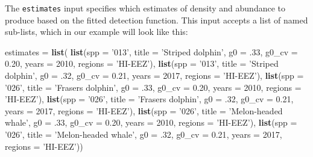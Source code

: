 \documentclass[
]{book}
\newenvironment{Shaded}{\begin{snugshade}}{\end{snugshade}}
\newcommand{\DataTypeTok}[1]{\textcolor[rgb]{0.13,0.29,0.53}{#1}}
\newcommand{\DecValTok}[1]{\textcolor[rgb]{0.00,0.00,0.81}{#1}}
\newcommand{\FloatTok}[1]{\textcolor[rgb]{0.00,0.00,0.81}{#1}}
\newcommand{\KeywordTok}[1]{\textcolor[rgb]{0.13,0.29,0.53}{\textbf{#1}}}
\newcommand{\NormalTok}[1]{#1}
\newcommand{\StringTok}[1]{\textcolor[rgb]{0.31,0.60,0.02}{#1}}
\begin{document}
The \texttt{estimates} input specifies which estimates of density and abundance to produce based on the fitted detection function. This input accepts a list of named sub-lists, which in our example will look like this:

\begin{Shaded}
\begin{Highlighting}[]
\NormalTok{estimates =}
\StringTok{  }\KeywordTok{list}\NormalTok{(}
    \KeywordTok{list}\NormalTok{(}\DataTypeTok{spp =} \StringTok{'013'}\NormalTok{,}
         \DataTypeTok{title =} \StringTok{'Striped dolphin'}\NormalTok{,}
         \DataTypeTok{g0 =} \FloatTok{.33}\NormalTok{, }\DataTypeTok{g0_cv =} \FloatTok{0.20}\NormalTok{,}
         \DataTypeTok{years =} \DecValTok{2010}\NormalTok{,}
         \DataTypeTok{regions =} \StringTok{'HI-EEZ'}\NormalTok{),}
    \KeywordTok{list}\NormalTok{(}\DataTypeTok{spp =} \StringTok{'013'}\NormalTok{,}
         \DataTypeTok{title =} \StringTok{'Striped dolphin'}\NormalTok{,}
         \DataTypeTok{g0 =} \FloatTok{.32}\NormalTok{, }\DataTypeTok{g0_cv =} \FloatTok{0.21}\NormalTok{,}
         \DataTypeTok{years =} \DecValTok{2017}\NormalTok{,}
         \DataTypeTok{regions =} \StringTok{'HI-EEZ'}\NormalTok{),}
    \KeywordTok{list}\NormalTok{(}\DataTypeTok{spp =} \StringTok{'026'}\NormalTok{,}
         \DataTypeTok{title =} \StringTok{'Frasers dolphin'}\NormalTok{,}
         \DataTypeTok{g0 =} \FloatTok{.33}\NormalTok{, }\DataTypeTok{g0_cv =} \FloatTok{0.20}\NormalTok{,}
         \DataTypeTok{years =} \DecValTok{2010}\NormalTok{,}
         \DataTypeTok{regions =} \StringTok{'HI-EEZ'}\NormalTok{),}
    \KeywordTok{list}\NormalTok{(}\DataTypeTok{spp =} \StringTok{'026'}\NormalTok{,}
         \DataTypeTok{title =} \StringTok{'Frasers dolphin'}\NormalTok{,}
         \DataTypeTok{g0 =} \FloatTok{.32}\NormalTok{, }\DataTypeTok{g0_cv =} \FloatTok{0.21}\NormalTok{,}
         \DataTypeTok{years =} \DecValTok{2017}\NormalTok{,}
         \DataTypeTok{regions =} \StringTok{'HI-EEZ'}\NormalTok{),}
    \KeywordTok{list}\NormalTok{(}\DataTypeTok{spp =} \StringTok{'026'}\NormalTok{,}
         \DataTypeTok{title =} \StringTok{'Melon-headed whale'}\NormalTok{,}
         \DataTypeTok{g0 =} \FloatTok{.33}\NormalTok{, }\DataTypeTok{g0_cv =} \FloatTok{0.20}\NormalTok{,}
         \DataTypeTok{years =} \DecValTok{2010}\NormalTok{,}
         \DataTypeTok{regions =} \StringTok{'HI-EEZ'}\NormalTok{),}
    \KeywordTok{list}\NormalTok{(}\DataTypeTok{spp =} \StringTok{'026'}\NormalTok{,}
         \DataTypeTok{title =} \StringTok{'Melon-headed whale'}\NormalTok{,}
         \DataTypeTok{g0 =} \FloatTok{.32}\NormalTok{, }\DataTypeTok{g0_cv =} \FloatTok{0.21}\NormalTok{,}
         \DataTypeTok{years =} \DecValTok{2017}\NormalTok{,}
         \DataTypeTok{regions =} \StringTok{'HI-EEZ'}\NormalTok{))}
\end{Highlighting}
\end{Shaded}
\end{document}
